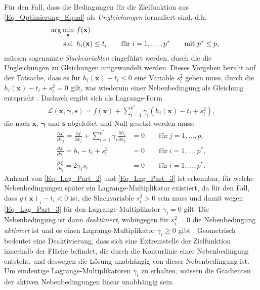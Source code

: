 \documentclass[12pt, a4paper]{report}\usepackage[]{graphicx}\usepackage[]{color}
\begin{document}
\begin{appendix}
Für den Fall, dass die Bedingungen für die Zielfunktion aus \ref{Eq_Optimierung_Equal} als \textit{Ungleichungen} formuliert sind, d.h.
\begin{align}\label{Eq_Optimierung_Unequal}
&&\arg \displaystyle\min_{\mathbf{x}} \ & f(\mathbf{x}) \notag \\ 
&&\text{s.d.} \ & h_i(\mathbf{x}) \le t_i \qquad \text{für} \  i=1,\dots,p^* \qquad \text{mit} \ p^* \le p ,
\end{align}
müssen sogenannte \textit{Slackvariablen} eingeführt werden, durch die die Ungleichungen zu Gleichungen umgewandelt werden. Dieses Vorgehen beruht auf der Tatsache, dass es für $h_i(\mathbf{x})-t_i \le 0$ eine Variable $s_i^2$ geben muss, durch die $h_i(\mathbf{x})-t_i + s_i^2 = 0$ gilt, was wiederum einer Nebenbedingung als Gleichung entspricht \cite{haftka1992elements}. Dadurch ergibt sich als Lagrange-Form
\begin{align}
\mathcal{L}(\mathbf{x}, \boldsymbol{\gamma}, \mathbf{s})=f(\mathbf{x})+ \sum_{i=1}^{p^*}\gamma_i (h_i(\mathbf{x})-t_i + s_i^2),
\end{align}
die nach $\mathbf{x}$, $\boldsymbol{\gamma}$ und $\mathbf{s}$ abgeleitet und Null gesetzt werden muss:
\begin{align}
\frac{\partial \mathcal{L}}{\partial x_j}=\frac{\partial f}{\partial x_j} + \sum_{i=1}^{p^*} \gamma_i \frac{\partial h_i}{\partial x_j} &= 0 \qquad \text{für} \ j=1,\dots,p  , \label{Eq_Lag_Part_1} \\
\frac{\partial \mathcal{L}}{\partial \gamma_i}=h_i - t_i + s_i^2 &=0 \qquad \text{für} \ i=1,\dots,p^*  , \label{Eq_Lag_Part_2} \\
\frac{\partial \mathcal{L}}{\partial s_i}=2\gamma_i s_i &=0
\qquad \text{für} \ i=1,\dots,p^*  . \label{Eq_Lag_Part_3}
\end{align}
Anhand von \eqref{Eq_Lag_Part_2} und \eqref{Eq_Lag_Part_3} ist erkennbar, für welche Nebenbedingungen später ein Lagrange-Multiplikator existiert, da für den Fall, dass $g(\mathbf{x})_i-t_i < 0$ ist, die Slackvariable $s^2_i > 0$ sein muss und damit wegen \eqref{Eq_Lag_Part_3} für den Lagrange-Multiplikator $\gamma_i=0$ gilt. Die Nebenbedingung ist dann \textit{deaktiviert}, wohingegen für $s_i^2=0$ die Nebenbedingung \textit{aktiviert} ist und es einen Lagrange-Multiplikator $\gamma_i \ge 0$ gibt \cite{arora2011introductionOptimum}. Geometrisch bedeutet eine Deaktivierung, dass sich eine Extremstelle der Zielfunktion innerhalb der Fläche befindet, die durch die Konturlinie einer Nebenbedingung entsteht, und deswegen die Lösung unabhängig von dieser Nebenbedingung ist. Um eindeutige Lagrange-Multiplikatoren $\gamma_i$ zu erhalten, müssen die Gradienten der aktiven Nebenbedingungen linear unabhängig sein.\\

\end{appendix}
\end{document}
